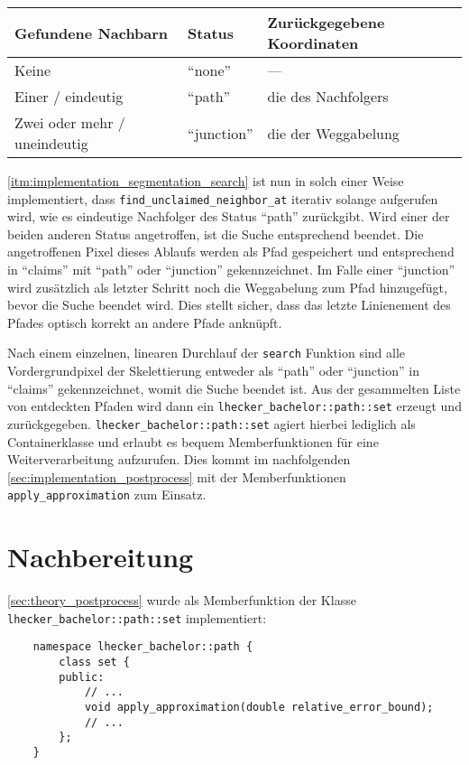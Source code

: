 \begin{tabu}{l|l|X}
    Gefundene Nachbarn & Status & Zurückgegebene Koordinaten \\
    \toprule
    Keine & \enquote{none} & --- \\
    Einer / eindeutig & \enquote{path} & die des Nachfolgers \\
    Zwei oder mehr / uneindeutig & \enquote{junction} & die der Weggabelung
\end{tabu}

\mbox{}

\autoref{itm:implementation_segmentation_search} ist nun in solch einer Weise implementiert, dass \texttt{find\_unclaimed\_neighbor\_at} iterativ solange aufgerufen wird, wie es eindeutige Nachfolger des Status \enquote{path} zurückgibt.
Wird einer der beiden anderen Status angetroffen, ist die Suche entsprechend beendet.
Die angetroffenen Pixel dieses Ablaufs werden als Pfad gespeichert und entsprechend in \enquote{claims} mit \enquote{path} oder \enquote{junction} gekennzeichnet.
Im Falle einer \enquote{junction} wird zusätzlich als letzter Schritt noch die Weggabelung zum Pfad hinzugefügt, bevor die Suche beendet wird.
Dies stellt sicher, dass das letzte Linienement des Pfades optisch korrekt an andere Pfade anknüpft.

Nach einem einzelnen, linearen Durchlauf der \texttt{search} Funktion sind alle Vordergrundpixel der Skelettierung entweder als \enquote{path} oder \enquote{junction} in \enquote{claims} gekennzeichnet, womit die Suche beendet ist.
Aus der gesammelten Liste von entdeckten Pfaden wird dann ein \texttt{lhecker\_bachelor::path::set} erzeugt und zurückgegeben.
\texttt{lhecker\_bachelor::path::set} agiert hierbei lediglich als Containerklasse und erlaubt es bequem Memberfunktionen für eine Weiterverarbeitung aufzurufen.
Dies kommt im nachfolgenden \autoref{sec:implementation_postprocess} mit der Memberfunktionen \texttt{apply\_approximation} zum Einsatz.

\clearpage
\section{Nachbereitung}%
\label{sec:implementation_postprocess}

\autoref{sec:theory_postprocess} wurde als Memberfunktion der Klasse \texttt{lhecker\_bachelor::path::set} implementiert:
\begin{verbatim}
    namespace lhecker_bachelor::path {
        class set {
        public:
            // ...
            void apply_approximation(double relative_error_bound);
            // ...
        };
    }
\end{verbatim}

